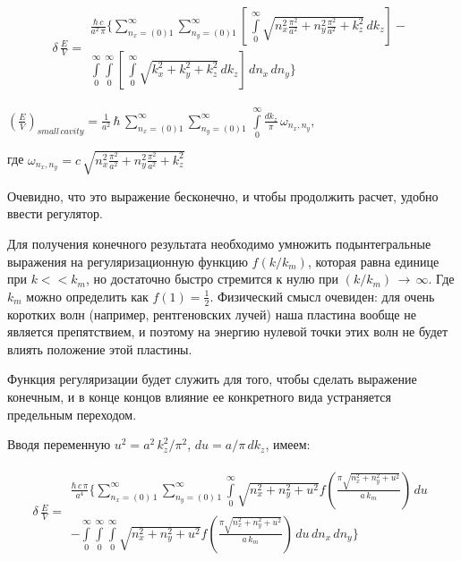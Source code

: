 \documentclass[11pt]{article}
\begin{document}
    \[\begin{array}{lr}
\delta\,\frac{E}{V} =
\begin{array}{c}
\frac{\hbar\,c}{a^2\,\pi}\Bigg\{\sum\limits_{n_x=(0)1}^{\infty}\sum\limits_{n_y=(0)1}^{\infty}\left[\,\int\limits_{0}^{\infty}\sqrt{n_x^2\frac{\pi^2}{a^2}+n_y^2\frac{\pi^2}{a^2}+k_z^2}\,dk_z\right] - \\ \int\limits_{0}^{\infty}\int\limits_{0}^{\infty}\left[\,\int\limits_{0}^{\infty}\sqrt{k_x^2+k_y^2+k_z^2}\,dk_z\right]\,dn_x\,dn_y\Bigg\}
\end{array}\end{array}\]

    

    \({\left(\frac{E}{V}\right)_{small\,cavity} = \frac{1}{a^2}\,\hbar \, \sum\limits_{n_x=(0)1}^{\infty}\sum\limits_{n_y=(0)1}^{\infty}\,\int\limits_{0}^{\infty} {\frac {dk_{z}}{\pi}}\,\omega _{n_x,n_y},}\)

    где
\(\omega _{n_x,n_y} = c\,\sqrt{n_x^2\frac{\pi^2}{a^2}+n_y^2\frac{\pi^2}{a^2}+k_z^2}\)

    Очевидно, что это выражение бесконечно, и чтобы продолжить расчет,
удобно ввести регулятор.

    Для получения конечного результата необходимо умножить подынтегральные
выражения на регуляризационную функцию \(f(k/k_m)\), которая равна
единице при \(k << k_m\), но достаточно быстро стремится к нулю при
\((k/k_m)\, \rightarrow\,\infty\). Где \(k_m\) можно определить как
\(f(1) = \frac{1}{2}\). Физический смысл очевиден: для очень коротких
волн (например, рентгеновских лучей) наша пластина вообще не является
препятствием, и поэтому на энергию нулевой точки этих волн не будет
влиять положение этой пластины.

    Функция регуляризации будет служить для того, чтобы сделать выражение
конечным, и в конце концов влияние ее конкретного вида устраняется
предельным переходом.

    Вводя переменную \(u^2 = a^2\,k_z^2/\pi^2\), \(du = a/\pi\,dk_z\),
имеем:

    \begin{equation}
\begin{array}{lr}
\delta\,\frac{E}{V} =
\begin{array}{c}
\frac{\hbar\,c\,\pi}{a^4}\Bigg\{
\sum\limits_{n_x=\left(0\right)\,1}^{\infty}
\sum\limits_{n_y=\left(0\right)\,1}^{\infty}
\int\limits_{0}^{\infty}
{\sqrt{n_x^2 + n_y^2 + u^2}}
f\left(\frac{\pi\sqrt{n_x^2 + n_y^2 + u^2}}{a\,k_m}\right)
\,d{u} \\
- \int\limits_{0}^{\infty}
\int\limits_{0}^{\infty}
\int\limits_{0}^{\infty}
{\sqrt{n_x^2 + n_y^2 + u^2}}
f\left(\frac{\pi\sqrt{n_x^2 + n_y^2 + u^2}}{a\,k_m}\right)
\,d{u}\,d{n_x}\,d{n_y}
\Bigg\}
\end{array}
\end{array}
\end{equation}
\end{document}
